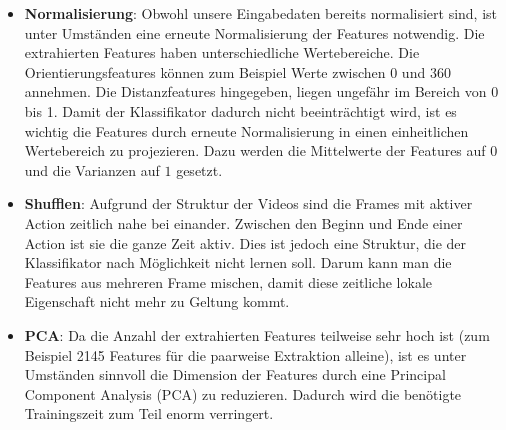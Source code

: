 \begin{itemize}

  \item \textbf{Normalisierung}: Obwohl unsere Eingabedaten bereits normalisiert sind, ist unter Umständen eine erneute Normalisierung der Features notwendig. Die extrahierten
        Features haben unterschiedliche Wertebereiche. Die Orientierungsfeatures können zum Beispiel Werte zwischen 0 und 360 annehmen. Die Distanzfeatures hingegeben, liegen
        ungefähr im Bereich von 0 bis 1. Damit der Klassifikator dadurch nicht beeinträchtigt wird, ist es wichtig die Features durch erneute Normalisierung in einen einheitlichen
        Wertebereich zu projezieren. Dazu werden die Mittelwerte der Features auf $0$ und die Varianzen auf $1$ gesetzt.

  \item \textbf{Shufflen}: 
    Aufgrund der Struktur der Videos sind die Frames mit aktiver Action zeitlich nahe bei einander. Zwischen den Beginn und Ende einer Action ist sie die ganze Zeit aktiv.
    Dies ist jedoch eine Struktur, die der Klassifikator nach Möglichkeit nicht lernen soll. Darum kann man die Features aus mehreren Frame mischen, damit diese zeitliche lokale Eigenschaft nicht mehr zu Geltung kommt.

  \item \textbf{PCA}: Da die Anzahl der extrahierten Features teilweise sehr hoch ist (zum Beispiel 2145 Features für die paarweise Extraktion alleine), ist es unter Umständen
    sinnvoll die Dimension der Features durch eine Principal Component Analysis (PCA) zu reduzieren. Dadurch wird die benötigte Trainingszeit zum Teil enorm verringert. 
\end{itemize}

